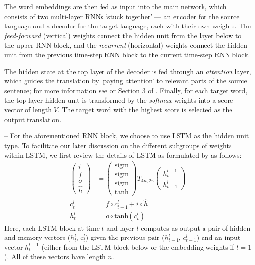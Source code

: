 The word embeddings are then fed as input into the main network, which consists
of two multi-layer RNNs `stuck together' --- an encoder for the source
language and a decoder for the target language, each with their own
weights. 
The \emph{feed-forward} (vertical) weights connect
the hidden unit from the layer below to the upper RNN block, and the
\emph{recurrent} (horizontal) weights connect the hidden unit from the previous
time-step RNN block to the current time-step RNN block.

The hidden state at the top layer of the decoder is fed through an
\textit{attention} layer, which guides the translation by `paying attention' to relevant parts of the source sentence; 
for more information see \cite{bahdanau2014neural} or Section 3 of \cite{luong2015effective}.
Finally, for each target word, the top layer hidden unit is transformed by the
\emph{softmax} weights into a score vector of length $V$. The target word with the highest score is selected as the output translation.

 -- For the aforementioned RNN block, we choose to
use LSTM as the hidden unit type. To facilitate our later discussion 
on the different subgroups of weights
within LSTM, we first review the details of LSTM as formulated by 
 as follows:
\begin{align}
\begin{pmatrix}
i\\
f\\
o\\
\hat{h}
\end{pmatrix}
&=
\begin{pmatrix}
\text{sigm}\\
\text{sigm}\\
\text{sigm}\\
\text{tanh}
\end{pmatrix}
T_{4n,2n}
\begin{pmatrix}
h_t^{l-1}\\
h_{t-1}^l
\end{pmatrix} \label{eqn:lstm_1} \\
c_t^l&=f \circ c_{t-1}^l + i \circ \hat{h} \label{eqn:lstm_2} \\
h_t^l &= o \circ \text{tanh}(c_t^l) \label{eqn:lstm_3}
\end{align}
Here, each LSTM block at time $t$ and layer $l$ computes as output a pair of
hidden and memory vectors ($h_t^l$, $c_t^l$) given the previous pair
($h_{t-1}^l$, $c_{t-1}^l$) and an input vector $h_t^{l-1}$ (either from the LSTM block below or
the embedding weights if $l\!=\!1$). All of these vectors
have length $n$.

